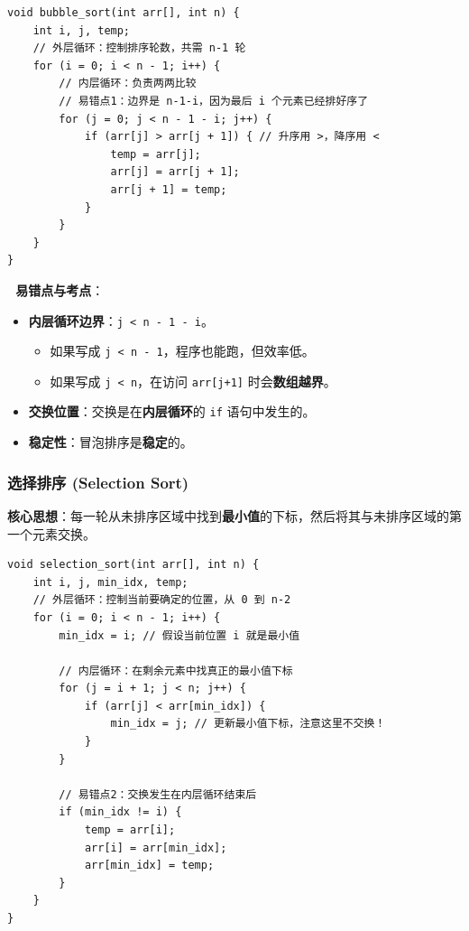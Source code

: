 \documentclass[a4paper,12pt]{article}
\begin{document}
\begin{lstlisting}
void bubble_sort(int arr[], int n) {
    int i, j, temp;
    // 外层循环：控制排序轮数，共需 n-1 轮
    for (i = 0; i < n - 1; i++) {
        // 内层循环：负责两两比较
        // 易错点1：边界是 n-1-i，因为最后 i 个元素已经排好序了
        for (j = 0; j < n - 1 - i; j++) {
            if (arr[j] > arr[j + 1]) { // 升序用 >，降序用 <
                temp = arr[j];
                arr[j] = arr[j + 1];
                arr[j + 1] = temp;
            }
        }
    }
}
\end{lstlisting}

\textbf{🔴 易错点与考点}：
\begin{itemize}
    \item \textbf{内层循环边界}：\texttt{j < n - 1 - i}。
    \begin{itemize}
        \item 如果写成 \texttt{j < n - 1}，程序也能跑，但效率低。
        \item 如果写成 \texttt{j < n}，在访问 \texttt{arr[j+1]} 时会\textbf{数组越界}。
    \end{itemize}
    \item \textbf{交换位置}：交换是在\textbf{内层循环}的 \texttt{if} 语句中发生的。
    \item \textbf{稳定性}：冒泡排序是\textbf{稳定}的。
\end{itemize}

\subsubsection{选择排序 (Selection Sort)}
\textbf{核心思想}：每一轮从未排序区域中找到\textbf{最小值}的下标，然后将其与未排序区域的第一个元素交换。

\begin{lstlisting}
void selection_sort(int arr[], int n) {
    int i, j, min_idx, temp;
    // 外层循环：控制当前要确定的位置，从 0 到 n-2
    for (i = 0; i < n - 1; i++) {
        min_idx = i; // 假设当前位置 i 就是最小值
        
        // 内层循环：在剩余元素中找真正的最小值下标
        for (j = i + 1; j < n; j++) {
            if (arr[j] < arr[min_idx]) {
                min_idx = j; // 更新最小值下标，注意这里不交换！
            }
        }
        
        // 易错点2：交换发生在内层循环结束后
        if (min_idx != i) {
            temp = arr[i];
            arr[i] = arr[min_idx];
            arr[min_idx] = temp;
        }
    }
}
\end{lstlisting}
\end{document}
